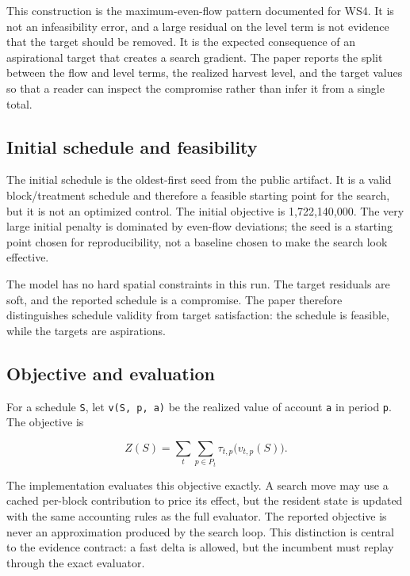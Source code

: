 \documentclass[preprint,11pt]{elsarticle}
\begin{document}
This construction is the maximum-even-flow pattern documented for WS4. It is not an infeasibility error, and a large residual on the level term is not evidence that the target should be removed. It is the expected consequence of an aspirational target that creates a search gradient. The paper reports the split between the flow and level terms, the realized harvest level, and the target values so that a reader can inspect the compromise rather than infer it from a single total.

\subsection{Initial schedule and feasibility}\label{initial-schedule-and-feasibility}

The initial schedule is the oldest-first seed from the public artifact. It is a valid block/treatment schedule and therefore a feasible starting point for the search, but it is not an optimized control. The initial objective is 1,722,140,000. The very large initial penalty is dominated by even-flow deviations; the seed is a starting point chosen for reproducibility, not a baseline chosen to make the search look effective.

The model has no hard spatial constraints in this run. The target residuals are soft, and the reported schedule is a compromise. The paper therefore distinguishes schedule validity from target satisfaction: the schedule is feasible, while the targets are aspirations.

\subsection{Objective and evaluation}\label{objective-and-evaluation}

For a schedule \texttt{S}, let \texttt{v(S,\ p,\ a)} be the realized value of account \texttt{a} in period \texttt{p}. The objective is

\begin{equation}
Z(S) = \sum_{t}\sum_{p\in P_t} \tau_{t,p}\bigl(v_{t,p}(S)\bigr).
\end{equation}

The implementation evaluates this objective exactly. A search move may use a cached per-block contribution to price its effect, but the resident state is updated with the same accounting rules as the full evaluator. The reported objective is never an approximation produced by the search loop. This distinction is central to the evidence contract: a fast delta is allowed, but the incumbent must replay through the exact evaluator.
\end{document}
